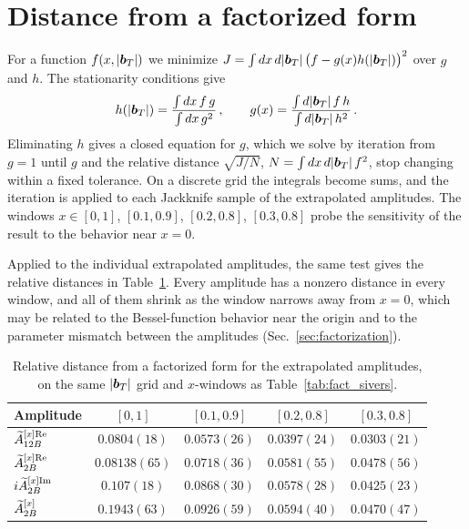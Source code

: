 \section{Distance from a factorized form}
\label{app:factorization_metric}

For a function $f(x,|\boldsymbol{b}_T|)$ we minimize $J=\int dx\,d|\boldsymbol{b}_T|\,\big(f-g(x)h(|\boldsymbol{b}_T|)\big)^2$ over $g$ and $h$. The stationarity conditions give
\begin{equation}
h(|\boldsymbol{b}_T|)=\frac{\int dx\,f\,g}{\int dx\,g^2}\,,\qquad
g(x)=\frac{\int d|\boldsymbol{b}_T|\,f\,h}{\int d|\boldsymbol{b}_T|\,h^2}\,.
\end{equation}
Eliminating $h$ gives a closed equation for $g$, which we solve by iteration from $g=1$ until $g$ and the relative distance $\sqrt{J/N}$, $N=\int dx\,d|\boldsymbol{b}_T|\,f^2$, stop changing within a fixed tolerance. On a discrete grid the integrals become sums, and the iteration is applied to each Jackknife sample of the extrapolated amplitudes. The windows $x\in[0,1]$, $[0.1,0.9]$, $[0.2,0.8]$, $[0.3,0.8]$ probe the sensitivity of the result to the behavior near $x=0$.

Applied to the individual extrapolated amplitudes, the same test gives the relative distances in Table~\ref{tab:fact_amps}. Every amplitude has a nonzero distance in every window, and all of them shrink as the window narrows away from $x=0$, which may be related to the Bessel-function behavior near the origin and to the parameter mismatch between the amplitudes (Sec.~\ref{sec:factorization}).

\begin{table}[H]
\caption{Relative distance from a factorized form for the extrapolated amplitudes, on the same $|\boldsymbol{b}_T|$ grid and $x$-windows as Table~\ref{tab:fact_sivers}.}
\label{tab:fact_amps}
\begin{ruledtabular}
\begin{tabular}{lcccc}
Amplitude & $[0,1]$ & $[0.1,0.9]$ & $[0.2,0.8]$ & $[0.3,0.8]$ \\
\hline
$\widetilde{A}^{[x]\text{Re}}_{12B}$ & $0.0804(18)$ & $0.0573(26)$ & $0.0397(24)$ & $0.0303(21)$ \\
$\widetilde{A}^{[x]\text{Re}}_{2B}$ & $0.08138(65)$ & $0.0718(36)$ & $0.0581(55)$ & $0.0478(56)$ \\
$i\widetilde{A}^{[x]\text{Im}}_{2B}$ & $0.107(18)$ & $0.0868(30)$ & $0.0578(28)$ & $0.0425(23)$ \\
$\widetilde{A}^{[x]}_{2B}$ & $0.1943(63)$ & $0.0926(59)$ & $0.0594(40)$ & $0.0470(47)$ \\
\end{tabular}
\end{ruledtabular}
\end{table}
